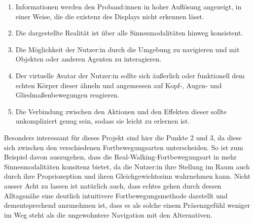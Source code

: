             \begin{enumerate}
                \item Informationen werden den Proband:innen in hoher Auflösung angezeigt, in einer Weise, die die existenz des Displays nicht erkennen lässt.

                \item Die dargestellte Realität ist über alle Sinnesmodalitäten hinweg konsistent.

                \item  Die Möglichkeit der Nutzer:in durch die Umgebung zu navigieren und mit Objekten oder anderen Agenten zu interagieren.

                \item Der virtuelle Avatar der Nutzer:in sollte sich äußerlich oder funktionell dem echten Körper dieser ähneln und angemessen auf Kopf-, Augen- und Gliedmaßenbewegungen reagieren.

                \item Die Verbindung zwischen den Aktionen und den Effekten dieser sollte unkompliziert genug sein, sodass sie leicht zu erlernen ist.
            \end{enumerate}

            Besonders interessant für dieses Projekt sind hier die Punkte 2 und 3, da diese sich zwischen den verschiedenen Fortbewegungsarten unterscheiden. So ist zum Beispiel davon auszugehen, dass die Real-Walking-Fortbewegungsart in mehr Sinnesmodalitäten konsitenz bietet, da die Nutzer:in ihre Stellung im Raum auch durch ihre Propriozeption und ihren Gleichgewichtssinn wahrnehmen kann.
            Nicht ausser Acht zu lassen ist natürlich auch, dass echtes gehen durch dessen Alltagsnähe eine deutlich intuitivere Fortbewegungsmethode darstellt und dementsprechend anzunehmen ist, dass es als solche einem Präsenzgefühl weniger im Weg steht als die ungewohntere Navigation mit den Alternativen.



